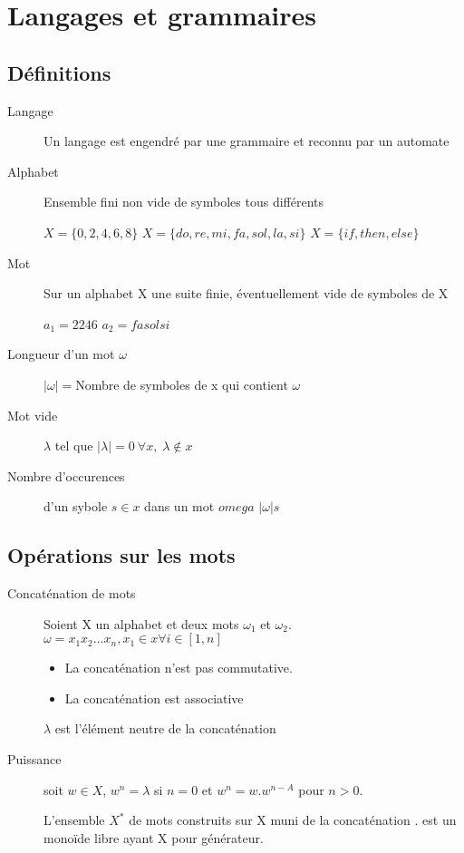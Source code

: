 \documentclass[12pt,a4paper,openany]{book}
\begin{document}
	\chapter{Langages et grammaires}
	\section{Définitions}
	\begin{description}
		\item[Langage] Un langage est engendré par une grammaire et reconnu par un automate	
		\item[Alphabet] Ensemble fini non vide de symboles tous différents
			\begin{exemple}
				$X = \{0,2,4,6,8\}$ $X=\{do, re, mi, fa, sol, la, si\}$ $X=\{if, then, else\}$	
			\end{exemple}
		\item[Mot] Sur un alphabet X une suite finie, éventuellement vide de symboles de X
			\begin{exemple}
				$a_1 = 2246$ $a_2 = fasolsi$
			\end{exemple}
		\item[Longueur d'un mot $\omega$] $|\omega|=$Nombre de symboles de x qui contient $\omega$
		\item[Mot vide] $\lambda$ tel que $|\lambda|=0\ \forall x,\; \lambda \not\in x$
		\item[Nombre d'occurences] d'un sybole $s\in x$ dans un mot $omega$ $|\omega|s$
	\end{description}
	\section{Opérations sur les mots}
	\begin{description}
		\item[Concaténation de mots] Soient X un alphabet et deux mots $\omega_1$ et $\omega_2$.\\
			$\omega = x_1x_2\ldots x_n, x_1 \in x \forall i\in[1,n]$
			\begin{attention}
				\begin{itemize}
					\item La concaténation n'est pas commutative.	
					\item La concaténation est associative
				\end{itemize}
			\end{attention}
			\begin{remarque}
				$\lambda$ est l'élément neutre de la concaténation
				\\
			\end{remarque}
		\item[Puissance] soit $w \in X$, $w^n = \lambda$ si $n=0$ et $w^n = w.w^{n-A}$ pour $n > 0$.
			\begin{remarque}
				L'ensemble $X^{*}$ de mots construits sur X muni de la concaténation $.$ est un monoïde libre ayant X pour générateur.
			\end{remarque}
	\end{description}
\end{document}
